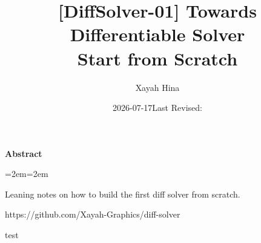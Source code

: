 \documentclass[11pt,twoside,fontset=none,scheme=plain]{ctexart}
\title{[DiffSolver-01] Towards Differentiable Solver \\ Start from Scratch}
\author{Xayah Hina}
\date{2026-07-17\quad\textperiodcentered\quad Last Revised: \writinglastrevised}
\makeatletter
\renewcommand{\abstractname}{Abstract}
\renewenvironment{abstract}{%
  \begin{center}
    \small\sffamily\bfseries\color{bookink}\abstractname
  \end{center}
  \begin{list}{}{\leftmargin=2em\rightmargin=2em}
    \item\relax\small\color{mutedink}\noindent\ignorespaces
}{%
  \end{list}
  \vspace{1.2em}
}
\renewcommand{\maketitle}{%
  \thispagestyle{plain}%
  \begin{center}
    \vspace*{0.6em}
    {\LARGE\sffamily\bfseries\color{bookink}\@title\par}
    \vspace{1em}
    {\small\color{mutedink}\@author\quad\textperiodcentered\quad\@date\par}
  \end{center}
  \vspace{1.8em}
}
\makeatother
\begin{document}
\maketitle

\begin{abstract}
Leaning notes on how to build the first diff solver from scratch.

https://github.com/Xayah-Graphics/diff-solver
\end{abstract}

test
\end{document}
